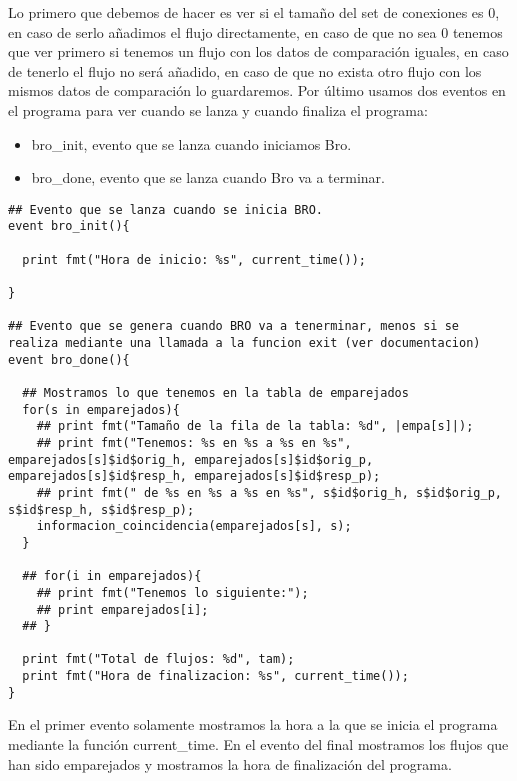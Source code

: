 Lo primero que debemos de hacer es ver si el tamaño del set de 
conexiones es 0, en caso de serlo añadimos el flujo directamente, 
en caso de que no sea 0 tenemos que ver primero si tenemos un flujo 
con los datos de comparación iguales, en caso de tenerlo el flujo 
no será añadido, en caso de que no exista otro flujo con los mismos 
datos de comparación lo guardaremos.
\intro
Por último usamos dos eventos en el programa para ver cuando se 
lanza y cuando finaliza el programa:
\intro
\begin{itemize}
\item bro\_init, evento que se lanza cuando iniciamos Bro.
\item bro\_done, evento que se lanza cuando Bro va a terminar.
\end{itemize}
\intro
\begin{verbatim}
## Evento que se lanza cuando se inicia BRO.
event bro_init(){

  print fmt("Hora de inicio: %s", current_time());

}

## Evento que se genera cuando BRO va a tenerminar, menos si se realiza mediante una llamada a la funcion exit (ver documentacion)
event bro_done(){

  ## Mostramos lo que tenemos en la tabla de emparejados
  for(s in emparejados){
    ## print fmt("Tamaño de la fila de la tabla: %d", |empa[s]|);
    ## print fmt("Tenemos: %s en %s a %s en %s", emparejados[s]$id$orig_h, emparejados[s]$id$orig_p, emparejados[s]$id$resp_h, emparejados[s]$id$resp_p);
    ## print fmt(" de %s en %s a %s en %s", s$id$orig_h, s$id$orig_p, s$id$resp_h, s$id$resp_p);
    informacion_coincidencia(emparejados[s], s);
  }

  ## for(i in emparejados){
    ## print fmt("Tenemos lo siguiente:");
    ## print emparejados[i];
  ## }

  print fmt("Total de flujos: %d", tam);
  print fmt("Hora de finalizacion: %s", current_time());
}
\end{verbatim}

En el primer evento solamente mostramos la hora a la que se 
inicia el programa mediante la función current_time. En el 
evento del final mostramos los flujos que han sido emparejados 
y mostramos la hora de finalización del programa.
